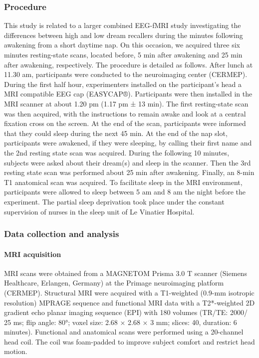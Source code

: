 \subsubsection*{Procedure}
This study is related to a larger combined EEG-fMRI study investigating the differences between high and low dream recallers during the minutes following awakening from a short daytime nap. On this occasion, we acquired three six minutes resting-state scans, located before, 5 min after awakening and 25 min after awakening, respectively. The procedure is detailed as follows. After lunch at 11.30 am, participants were conducted to the neuroimaging center (CERMEP). During the first half hour, experimenters installed on the participant’s head a MRI compatible EEG cap (EASYCAP®). Participants were then installed in the MRI scanner at about 1.20 pm (1.17 pm ± 13 min). The first resting-state scan was then acquired, with the instructions to remain awake and look at a central fixation cross on the screen. At the end of the scan, participants were informed that they could sleep during the next 45 min. At the end of the nap slot, participants were awakened, if they were sleeping, by calling their first name and the 2nd resting state scan was acquired. During the following 10 minutes, subjects were asked about their dream(s) and sleep in the scanner. Then the 3rd resting state scan was performed about 25 min after awakening. Finally, an 8-min T1 anatomical scan was acquired. To facilitate sleep in the MRI environment, participants were allowed to sleep between 5 am and 8 am the night before the experiment. The partial sleep deprivation took place under the constant supervision of nurses in the sleep unit of Le Vinatier Hospital.

\subsubsection*{Data collection and analysis}
\paragraph{MRI acquisition}
MRI scans were obtained from a MAGNETOM Prisma 3.0 T scanner (Siemens Healthcare, Erlangen, Germany) at the Primage neuroimaging platform (CERMEP). Structural MRI were acquired with a T1-weighted (0.9-mm isotropic resolution) MPRAGE sequence and functional MRI data with a T2*-weighted 2D gradient echo planar imaging sequence (EPI) with 180 volumes (TR/TE: 2000/ 25 ms; flip angle: 80°; voxel size: 2.68 × 2.68 × 3 mm; slices: 40, duration: 6 minutes). Functional and anatomical scans were performed using a 20-channel head coil. The coil was foam-padded to improve subject comfort and restrict head motion.

